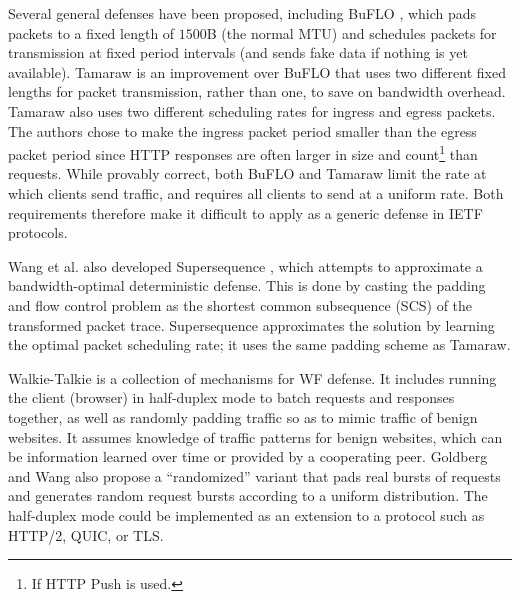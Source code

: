 \documentclass[runningheads]{llncs}
\begin{document}
Several general defenses have been proposed, including BuFLO \cite{dyer2012peek}, which pads packets to
a fixed length of $1500$B (the normal MTU) and schedules packets for transmission at fixed period intervals
(and sends fake data if nothing is yet available). Tamaraw \cite{wang2014comparing} is an improvement over BuFLO
that uses two different fixed lengths for packet transmission, rather than one, to save on bandwidth overhead.
Tamaraw also uses two different scheduling rates for ingress and egress packets. The authors chose to make
the ingress packet period smaller than the egress packet period since HTTP responses are often larger in size
and count\footnote{If HTTP Push is used.} than requests. While provably correct, both BuFLO and Tamaraw limit
the rate at which clients send traffic, and requires all clients to send at a uniform rate. Both requirements
therefore make it difficult to apply as a generic defense in IETF protocols.

Wang et al. also developed Supersequence \cite{wang2016website}, which attempts to approximate a bandwidth-optimal
deterministic defense. This is done by casting the padding and flow control problem as the shortest common
subsequence (SCS) of the transformed packet trace. Supersequence approximates the solution by learning the optimal
packet scheduling rate; it uses the same padding scheme as Tamaraw.

Walkie-Talkie \cite{wang2015walkie} is a collection of mechanisms for WF defense. It includes running
the client (browser) in half-duplex mode to batch requests and responses together, as well as randomly
padding traffic so as to mimic traffic of benign websites. It assumes knowledge of traffic patterns for
benign websites, which can be information learned over time or provided by a cooperating peer. Goldberg
and Wang also propose a ``randomized'' variant that pads real bursts of requests and generates random
request bursts according to a uniform distribution. The half-duplex mode could be implemented as an extension
to a protocol such as HTTP/2, QUIC, or TLS.
\end{document}

